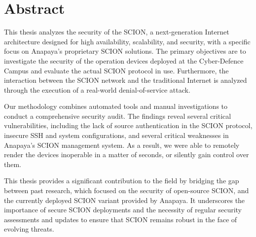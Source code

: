 \chapter*{Abstract}





This thesis analyzes the security of the SCION, a next-generation Internet architecture designed for high availability, scalability, and security, with a specific focus on Anapaya's proprietary SCION solutions.
The primary objectives are to investigate the security of the operation devices deployed at the Cyber-Defence Campus and evaluate the actual SCION protocol in use.
Furthermore, the interaction between the SCION network and the traditional Internet is analyzed through the execution of a real-world denial-of-service attack.

Our methodology combines automated tools and manual investigations to conduct a comprehensive security audit.
The findings reveal several critical vulnerabilities, including the lack of source authentication in the SCION protocol, insecure SSH and system configurations, and several critical weaknesses in Anapaya's SCION management system.
As a result, we were able to remotely render the devices inoperable in a matter of seconds, or silently gain control over them.

This thesis provides a significant contribution to the field by bridging the gap between past research, which focused on the security of open-source SCION, and the currently deployed SCION variant provided by Anapaya.
It underscores the importance of secure SCION deployments and the necessity of regular security assessments and updates to ensure that SCION remains robust in the face of evolving threats.